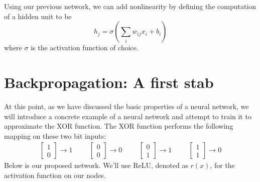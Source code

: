 \documentclass[12pt,letterpaper]{book}
\theoremstyle{definition}
\begin{document}
  Using our previous network, we can add nonlinearity by defining the computation of a hidden unit to be 
  \[
    h_j = \sigma\left( \sum_{i}w_{ij}x_i + b_i \right)  
  \]
  where $\sigma$ is the activation function of choice. 

  \section{Backpropagation: A first stab}
  At this point, as we have discussed the basic properties of a neural network, 
  we will introduce a concrete example of a neural network and attempt to train it to 
  approximate the XOR function. The XOR function 
  performs the following mapping on these two bit inputs:
  \begin{align}
        \begin{bmatrix}
        1 \\ 0
      \end{bmatrix} \rightarrow 1 
      \hspace{1cm}
      \begin{bmatrix}
        0 \\ 0
      \end{bmatrix} \rightarrow 0
      \hspace{1cm}
      \begin{bmatrix}
        0 \\ 1
      \end{bmatrix} \rightarrow 1
      \hspace{1cm}
      \begin{bmatrix}
        1 \\ 1
      \end{bmatrix} \rightarrow 0
    \end{align}
  Below is our proposed network. We'll use ReLU, denoted as $r(x)$, 
  for the activation function on our nodes. 
\end{document}
